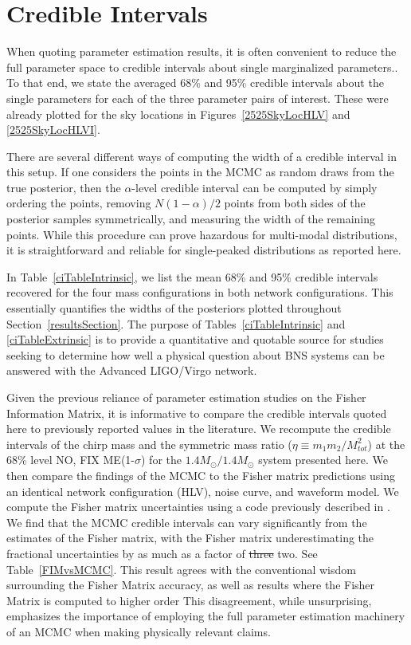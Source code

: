 \documentclass[11pt,a4paper]{emulateapj} 
\newcommand{\carl}[1]{{\color{red} #1}}
\begin{document}
\section{Credible Intervals}
\label{ciSection}

When quoting parameter estimation results, it is often convenient to
reduce the full parameter space to credible intervals about single
marginalized parameters..  To that end, we state the averaged 68\% and 95\% credible
intervals about the single parameters for each of the three
parameter pairs of interest.  These were already plotted for the sky
locations in Figures~\ref{2525SkyLocHLV} and \ref{2525SkyLocHLVI}.

There are several different ways of computing the width of a credible
interval in this setup.  If one considers the points in the MCMC as
random draws from the true posterior, then the $\alpha$-level credible
interval can be computed by simply ordering the points, removing
$N(1-\alpha )/2$ points from both sides of the posterior samples
symmetrically, and measuring the width of the remaining points.  While
this procedure can prove hazardous for multi-modal distributions, it
is straightforward and reliable for single-peaked distributions as
reported here.

In Table~\ref{ciTableIntrinsic}, we list the mean 68\% and 95\% credible
intervals recovered for the four mass configurations in both network
configurations. This essentially quantifies the widths of the
posteriors plotted throughout Section~\ref{resultsSection}.  The
purpose of Tables~\ref{ciTableIntrinsic} and \ref{ciTableExtrinsic} is
to provide a quantitative and quotable source for studies seeking to
determine how well a physical question about BNS systems can be
answered with the Advanced LIGO/Virgo network.

Given the previous reliance of parameter estimation studies on the Fisher
Information Matrix, it is informative to compare the credible intervals quoted here 
to previously reported values in the literature.  We recompute the credible intervals 
of the chirp mass and the symmetric mass ratio ($\eta \equiv m_1 m_2 / M_{tot}^2$)
at the 68\% level \carl{NO, FIX ME}(1-$\sigma$) for the $1.4M_{\odot}/1.4M_{\odot}$ system presented 
here.  We then compare the findings of the MCMC to the Fisher matrix predictions using
an identical network configuration (HLV), noise curve, and waveform model.  
We compute the Fisher matrix uncertainties 
using a code previously described in \cite{Inadequacies}.  We find that the MCMC credible
 intervals \carl{can} vary significantly from
the estimates of the Fisher matrix, with the Fisher matrix underestimating the 
fractional uncertainties by as much as a factor of \sout{three} \carl{two}.  See Table~\ref{FIMvsMCMC}.  This 
result agrees with the conventional wisdom surrounding the Fisher Matrix accuracy,
as well as results where the Fisher Matrix is computed to higher order \citep{Vitale2010}
   This disagreement, while 
   unsurprising, emphasizes the importance of employing the full parameter estimation
    machinery of an MCMC when making physically relevant claims.
\end{document}
